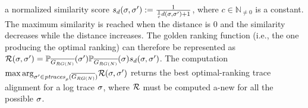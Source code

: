 a normalized similarity score $s_d(\logtrace,\nonlogtrace):=\frac{1}{\frac{1}{c}d(\logtrace,\nonlogtrace)+1}$, where  $c\in\mathbb{N}_{\neq0}$ is a constant. The maximum similarity is reached when the distance is $0$ and the similarity decreases while the distance increases. %
 The golden ranking function (i.e., the one producing the optimal ranking) can therefore be represented as $\goldenrank(\logtrace,\nonlogtrace)=\probskip{\nonlogtrace} \probskip{\logtrace} s_d(\logtrace,\nonlogtrace)$. The computation ${\max\arg}_{\nonlogtrace\in \WCal{\pmin}{n}} \goldenrank(\logtrace,{\nonlogtrace})$ returns the best optimal-ranking trace alignment for a log trace $\logtrace$, where $\goldenrank$ must be computed a-new for all the possible $\logtrace$. 

